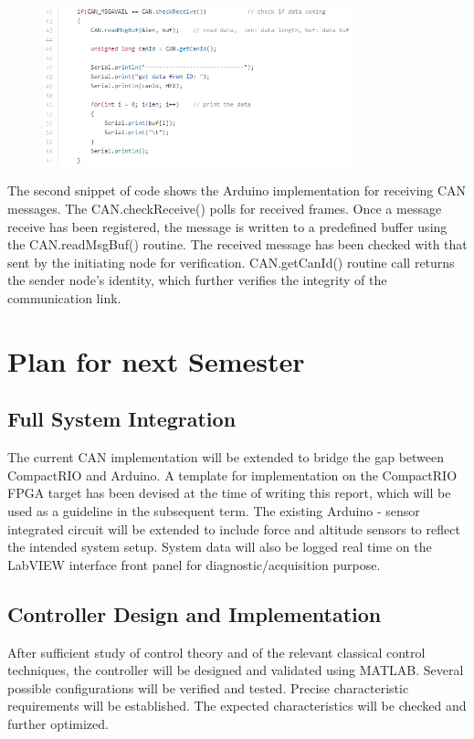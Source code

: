 \documentclass{article}
\begin{document}
\begin{figure}[!ht]
\centering 
\includegraphics[width=9cm]{5.png}
\end{figure}

\begin{flushleft}
The second snippet of code shows the Arduino implementation for receiving CAN messages. The CAN.checkReceive() polls for received frames. Once a message receive has been registered, the message is written to a predefined buffer using the CAN.readMsgBuf() routine. The received message has been checked with that sent by the initiating node for verification. CAN.getCanId() routine call returns the sender node’s identity, which further verifies the integrity of the communication link.
\end{flushleft}

\section{Plan for next Semester}
\subsection{Full System Integration}
\begin{flushleft}
The current CAN implementation will be extended to bridge the gap between CompactRIO and Arduino. A template for implementation on the CompactRIO FPGA target has been devised at the time of writing this report, which will be used as a guideline in the subsequent term. The existing Arduino - sensor integrated circuit will be extended to include force and altitude sensors to reflect the intended system setup. System data will also be logged real time on the LabVIEW interface front panel for diagnostic/acquisition purpose. 
\end{flushleft}

\subsection{Controller Design and Implementation}
\begin{flushleft}
After sufficient study of control theory and of the relevant classical control techniques, the controller will be designed and validated using MATLAB. Several possible configurations will be verified and tested. Precise characteristic requirements will be established. The expected characteristics will be checked and further optimized. 
\end{flushleft}
\end{document}

